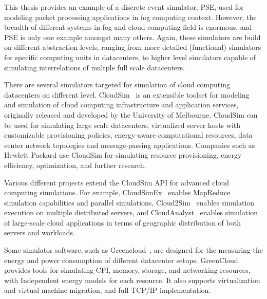 This thesis provides an example of a discrete event simulator, PSE, used for modeling packet processing applications in fog computing context. However, the breadth of different systems in fog and cloud computing field is enormous, and PSE is only one example amongst many others. Again, these simulators are build on different abstraction levels, ranging from more detailed (functional) simulators for specific computing units in datacenters, to higher level simulators capable of simulating interrelations of multple full scale datacenters.

There are several simulators targeted for simulation of cloud computing datacenters on different level. CloudSim~\cite{Calheiros:2011:Cloudsim} is an extensible toolset for modeling and simulation of cloud computing infrastructure and application services, originally released and developed by the University of Melbourne. CloudSim can be used for simulating large scale datacenters, virtualized server hosts with customizable provisioning policies, energy-aware computational resources, data center network topologies and message-passing applications. Companies such as Hewlett Packard use CloudSim for simulating resource provisioning, energy efficiency, optimization, and further research.

Various different projects extend the CloudSim API for advanced cloud computing simulations. For example, CloudSimEx~\cite{CloudSimEx} enables MapReduce simulation capabilities and parallel simulations, Cloud2Sim~\cite{Kathiravelu:2014:Concurrent} enables simulation execution on multiple distributed servers, and CloudAnalyst~\cite{Wickremasinghe:2010:CloudAnalyst} enables simulation of large-scale cloud applications in terms of geographic distribution of both servers and workloads.

Some simulator software, such as Greencloud~\cite{Kliazovich:2010:GreenCloud}, are designed for the measuring the energy and power consumption of different datacenter setups. GreenCloud provides tools for simulating CPI, memory, storage, and networking resources, with Independent energy models for each resource. It also supports virtualization and virtual machine migration, and full TCP/IP implementation.





